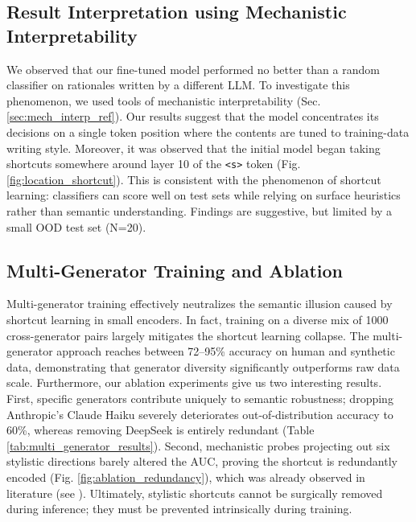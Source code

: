 \documentclass[10pt,conference,compsocconf]{IEEEtran}
\begin{document}
\subsection{Result Interpretation using Mechanistic Interpretability}

We observed that our fine-tuned model performed no better than a random classifier on rationales written by a different LLM. To investigate this phenomenon, we used tools of mechanistic interpretability (Sec. \ref{sec:mech_interp_ref}). Our results suggest that the model concentrates its decisions on a single token position where the contents are tuned to training-data writing style. Moreover, it was observed that the initial model began taking shortcuts somewhere around layer 10 of the \texttt{<s>} token (Fig. \ref{fig:location_shortcut}). This is consistent with the phenomenon of shortcut learning: classifiers can score well on test sets while relying on surface heuristics rather than semantic understanding. Findings are suggestive, but limited by a small OOD test set (N=20).

\subsection{Multi-Generator Training and Ablation}

Multi-generator training effectively neutralizes the semantic illusion caused by shortcut learning in small encoders. In fact, training on a diverse mix of 1000 cross-generator pairs largely mitigates the shortcut learning collapse. The multi-generator approach reaches between 72–95\% accuracy on human and synthetic data, demonstrating that generator diversity significantly outperforms raw data scale. Furthermore, our ablation experiments give us two interesting results. First, specific generators contribute uniquely to semantic robustness; dropping Anthropic’s Claude Haiku severely deteriorates out-of-distribution accuracy to 60\%, whereas removing DeepSeek is entirely redundant (Table \ref{tab:multi_generator_results}). Second, mechanistic probes projecting out six stylistic directions barely altered the AUC, proving the shortcut is redundantly encoded (Fig. \ref{fig:ablation_redundancy}), which was already observed in literature (see \cite{elazar2021amnesic}). Ultimately, stylistic shortcuts cannot be surgically removed during inference; they must be prevented intrinsically during training.

\end{document}
